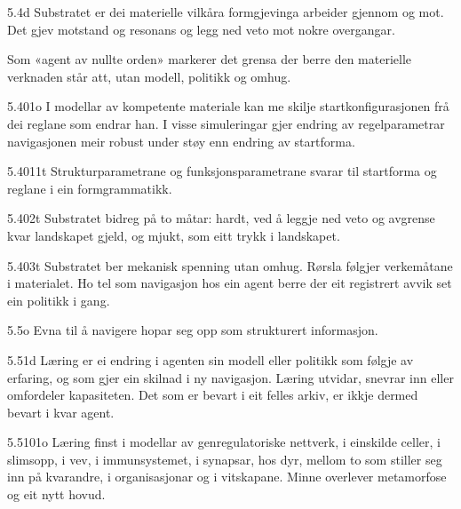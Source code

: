 \begin{formproposition}{5.4}{d}
Substratet er dei materielle vilkåra formgjevinga arbeider gjennom og mot. Det gjev motstand og resonans og legg ned veto mot nokre overgangar.

Som «agent av nullte orden» markerer det grensa der berre den materielle verknaden står att, utan modell, politikk og omhug.
\end{formproposition}

\begin{formproposition}{5.401}{o}
I modellar av kompetente materiale kan me skilje startkonfigurasjonen frå dei reglane som endrar han. I visse simuleringar gjer endring av regelparametrar navigasjonen meir robust under støy enn endring av startforma.
\end{formproposition}

\begin{formproposition}{5.4011}{t}
Strukturparametrane og funksjonsparametrane svarar til startforma og reglane i ein formgrammatikk.
\end{formproposition}

\begin{formproposition}{5.402}{t}
Substratet bidreg på to måtar: hardt, ved å leggje ned veto og avgrense kvar landskapet gjeld, og mjukt, som eitt trykk i landskapet.
\end{formproposition}

\begin{formproposition}{5.403}{t}
Substratet ber mekanisk spenning utan omhug. Rørsla følgjer verkemåtane i materialet. Ho tel som navigasjon hos ein agent berre der eit registrert avvik set ein politikk i gang.
\end{formproposition}

\begin{formproposition}{5.5}{o}
Evna til å navigere hopar seg opp som strukturert informasjon.
\end{formproposition}

\begin{formproposition}{5.51}{d}
Læring er ei endring i agenten sin modell eller politikk som følgje av erfaring, og som gjer ein skilnad i ny navigasjon. Læring utvidar, snevrar inn eller omfordeler kapasiteten. Det som er bevart i eit felles arkiv, er ikkje dermed bevart i kvar agent.
\end{formproposition}

\begin{formproposition}{5.5101}{o}
Læring finst i modellar av genregulatoriske nettverk, i einskilde celler, i slimsopp, i vev, i immunsystemet, i synapsar, hos dyr, mellom to som stiller seg inn på kvarandre, i organisasjonar og i vitskapane. Minne overlever metamorfose og eit nytt hovud.
\end{formproposition}

